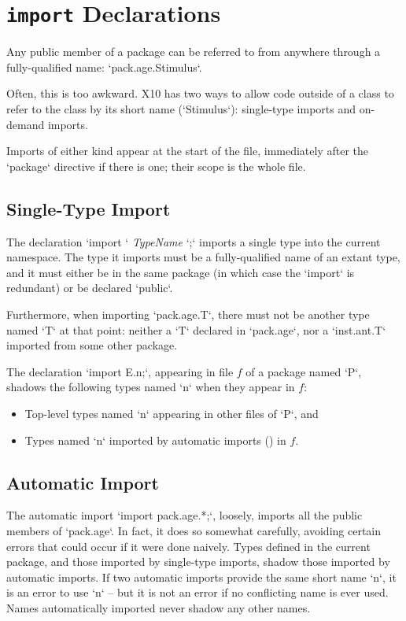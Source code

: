 \section{{\tt import} Declarations}
\label{sect:ImportDecl}

Any public member of a package can be referred to from anywhere through a
fully-qualified name: \xcd`pack.age.Stimulus`.    

Often, this is too awkward.  X10 has two ways to allow code outside of a class
to refer to the class by its short name (\xcd`Stimulus`): single-type imports
and on-demand imports.   

Imports of either kind appear at the start of the file, immediately after the
\xcd`package` directive if there is one; their scope is the whole file.

\subsection{Single-Type Import}

The declaration \xcd`import ` {\em TypeName} \xcd`;` imports a single type
into the current namespace.  The type it imports must be a fully-qualified
name of an extant type, and it must either be in the same package (in which
case the \xcd`import` is redundant) or be declared \xcd`public`.  

Furthermore, when importing \xcd`pack.age.T`, there must not be another type
named \xcd`T` at that point: neither a  \xcd`T` declared in \xcd`pack.age`,
nor a \xcd`inst.ant.T` imported from some other package.

The declaration \xcd`import E.n;`, appearing in file $f$ of a package named
\xcd`P`, shadows the following types named \xcd`n` when they appear in $f$: 
\begin{itemize}
\item Top-level types named \xcd`n` appearing in other files of \xcd`P`, and 
\item Types named \xcd`n` imported by automatic imports
      () in $f$.
\end{itemize}
\noindent


\subsection{Automatic Import}
\label{sect:AutomaticImport}

The automatic import \xcd`import pack.age.*;`, loosely, imports all the public
members of \xcd`pack.age`.  In fact, it does so somewhat carefully, avoiding
certain errors that could occur if it were done naively.  Types defined in the
current package, and those imported by single-type imports, shadow those
imported by automatic imports.   
If two automatic imports provide the same short name \xcd`n`, it is an error
to use \xcd`n` -- but it is not an error if no conflicting name is ever used. 
Names automatically imported never shadow any
other names.



